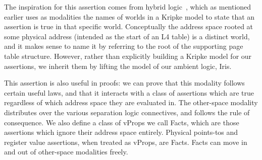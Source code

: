 The inspiration for this assertion comes from hybrid logic~\cite{blackburn1995hybrid,areces2001hybrid,goranko1996hierarchies,gargov1993modal},
which as mentioned earlier uses as modalities the names of worlds in a Kripke model to state
that an assertion is true in that specific world.
Conceptually the address space rooted at some physical address (intended as the start of an L4 table)
is a distinct world, and it makes sense to name it by referring to the root of the
supporting page table structure. However, rather than explicitly building a Kripke model for our
assertions, we inherit them by lifting the model of our ambient logic, Iris.

This assertion is also useful in proofs: we can prove that this modality follows certain useful laws, and that it interacts with
a class of assertions which are true regardless of which address space they are evaluated in.
The other-space modality distributes over the various separation logic connectives, and follows the rule of
consequence.
We also define a class of \textsf{vProp}s we call \textsf{Fact}s, which are those assertions
which ignore their address space entirely.
Physical points-tos and register value assertions, when treated as \textsf{vProp}s, are \textsf{Fact}s.
\textsf{Fact}s can move in and out of other-space modalities freely.



  



